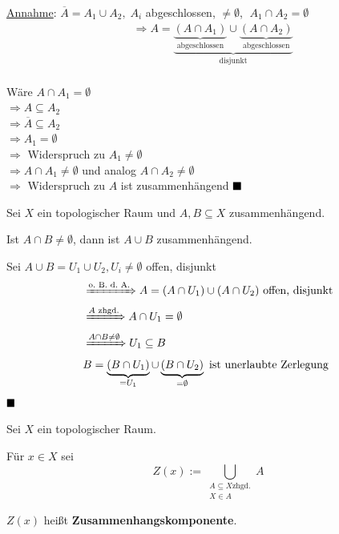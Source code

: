 \begin{beweis}
    \underline{Annahme}: $\overline{A} = A_1 \cup A_2,\; A_i$ abgeschlossen, $\neq \emptyset$,
    $\;A_1 \cap A_2 = \emptyset$
    \begin{align*}
        &\Rightarrow A = \underbrace{\underbrace{(A \cap A_1)}_\text{abgeschlossen} \cup \underbrace{(A \cap A_2)}_\text{abgeschlossen}}_\text{disjunkt}\\
    \end{align*}

    Wäre $A \cap A_1 = \emptyset$\\
    $\Rightarrow A \subseteq A_2$\\
    $\Rightarrow \overline{A} \subseteq A_2$\\
    $\Rightarrow A_1 = \emptyset$\\
    $\Rightarrow$ Widerspruch zu $A_1 \neq \emptyset$\\
    $\Rightarrow A \cap A_1 \neq \emptyset$ und analog 
                $A \cap A_2 \neq \emptyset$\\
    $\Rightarrow$ Widerspruch zu $A$ ist zusammenhängend $ \qed$
\end{beweis}

\begin{korollar}\label{zusammenhangVereinigung}
    Sei $X$ ein topologischer Raum und $A, B \subseteq X$ zusammenhängend.

    Ist $A \cap B \neq \emptyset$, dann ist $A \cup B$ zusammenhängend.
\end{korollar}

\begin{beweis}
    Sei $A \cup B = U_1 \cup U_2, U_i \neq \emptyset$ offen, disjunkt
    \begin{align*}
        &\xRightarrow{\text{o.~B.~d.~A.}} A = (A \cap U_1) \cup (A \cap U_2) \text{ offen, disjunkt}\\
        &\xRightarrow{A \text{ zhgd.}} A \cap U_1 = \emptyset\\
        &\xRightarrow{A \cap B \neq \emptyset} U_1 \subseteq B\\
        &B = \underbrace{(B \cap U_1)}_{= U_1} \cup \underbrace{(B \cap U_2)}_{= \emptyset} \text{ ist unerlaubte Zerlegung}
    \end{align*}
    $\qed$
\end{beweis}

\begin{definition}
    Sei $X$ ein topologischer Raum.
    
    Für $x \in X$ sei 
    \[Z(x) := \bigcup_{\substack{A \subseteq X \text{zhgd.}\\ X \in A}} A\]

     $Z(x)$ heißt \textbf{Zusammenhangskomponente}.
\end{definition}

